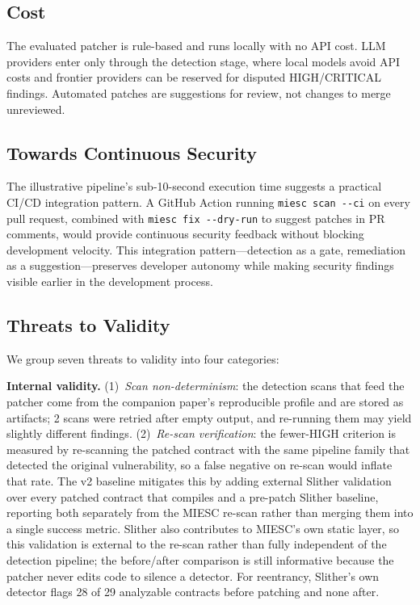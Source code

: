 \documentclass[conference]{IEEEtran}
\begin{document}
\subsection{Cost}

The evaluated patcher is rule-based and runs locally with no API cost. LLM providers enter only through the detection stage, where local models avoid API costs and frontier providers can be reserved for disputed HIGH/CRITICAL findings. Automated patches are suggestions for review, not changes to merge unreviewed.

\subsection{Towards Continuous Security}

The illustrative pipeline's sub-10-second execution time suggests a practical CI/CD integration pattern. A GitHub Action running \texttt{miesc scan -{}-ci} on every pull request, combined with \texttt{miesc fix -{}-dry-run} to suggest patches in PR comments, would provide continuous security feedback without blocking development velocity. This integration pattern---detection as a gate, remediation as a suggestion---preserves developer autonomy while making security findings visible earlier in the development process.

\subsection{Threats to Validity}
\label{sec:threats}

We group seven threats to validity into four categories:

\textbf{Internal validity.} (1)~\emph{Scan non-determinism}: the detection scans that feed the patcher come from the companion paper's reproducible profile and are stored as artifacts; 2 scans were retried after empty output, and re-running them may yield slightly different findings. (2)~\emph{Re-scan verification}: the fewer-HIGH criterion is measured by re-scanning the patched contract with the same pipeline family that detected the original vulnerability, so a false negative on re-scan would inflate that rate. The v2 baseline mitigates this by adding external Slither validation over every patched contract that compiles and a pre-patch Slither baseline, reporting both separately from the MIESC re-scan rather than merging them into a single success metric. Slither also contributes to MIESC's own static layer, so this validation is external to the re-scan rather than fully independent of the detection pipeline; the before/after comparison is still informative because the patcher never edits code to silence a detector. For reentrancy, Slither's own detector flags 28 of 29 analyzable contracts before patching and none after.
\end{document}
